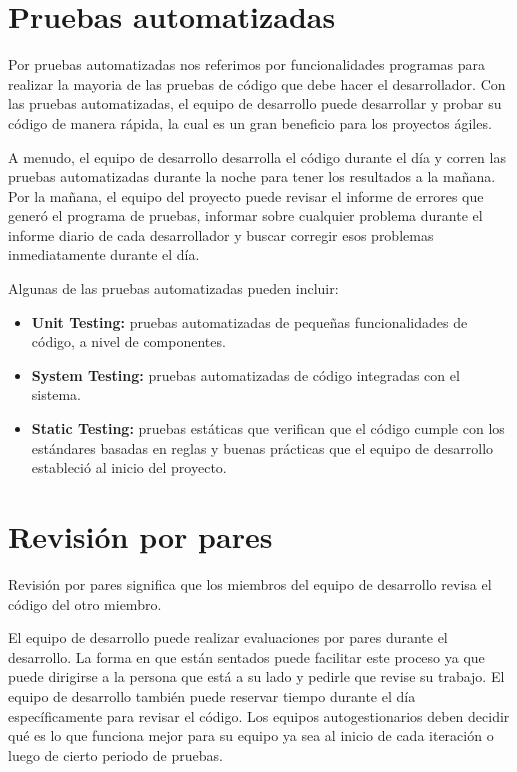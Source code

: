 \section{Pruebas automatizadas}
Por pruebas automatizadas nos referimos por funcionalidades programas para realizar la mayoria de las pruebas de código que debe hacer el desarrollador. Con las pruebas automatizadas, el equipo de desarrollo puede desarrollar y probar su código de manera rápida, la cual es un gran beneficio para los proyectos ágiles.

A menudo, el equipo de desarrollo desarrolla el código durante el día y corren las pruebas automatizadas durante la noche para tener los resultados a la mañana. Por la mañana, el equipo del proyecto puede revisar el informe de errores que generó el programa de pruebas, informar sobre cualquier problema durante el informe diario de cada desarrollador y buscar corregir esos problemas inmediatamente durante el día.

Algunas de las pruebas automatizadas pueden incluir:
\begin{itemize}
	\item \textbf{Unit Testing:} pruebas automatizadas de pequeñas funcionalidades de código, a nivel de componentes.
	\item \textbf{System Testing:} pruebas automatizadas de código integradas con el sistema.
	\item \textbf{Static Testing:} pruebas estáticas que verifican que el código cumple con los estándares basadas en reglas y buenas prácticas que el equipo de desarrollo estableció al inicio del proyecto.
\end{itemize}

\section{Revisión por pares}
Revisión por pares significa que los miembros del equipo de desarrollo revisa el código del otro miembro.

El equipo de desarrollo puede realizar evaluaciones por pares durante el desarrollo. La forma en que están sentados puede facilitar este proceso ya que puede dirigirse a la persona que está a su lado y pedirle que revise su trabajo. El equipo de desarrollo también puede reservar tiempo durante el día específicamente para revisar el código. Los equipos autogestionarios deben decidir qué es lo que funciona mejor para su equipo ya sea al inicio de cada iteración o luego de cierto periodo de pruebas.

